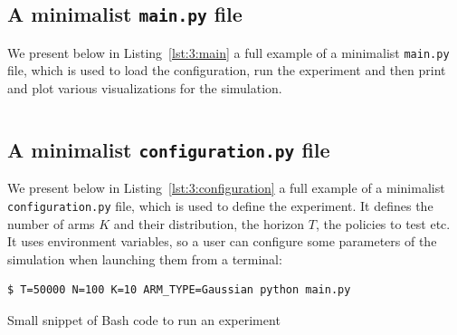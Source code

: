 {\subsection{A minimalist \texttt{main.py} file}

We present below in Listing~\ref{lst:3:main} a full example of a minimalist \texttt{main.py} file,
which is used to load the configuration, run the experiment and then print and plot various visualizations for the simulation.

\begin{small}
    \inputminted[linenos=true,numbersep=5pt,frame=lines,framesep=2mm]{python3}{2-Chapters/3-Chapter/src/example_of_main_singleplayer.py}
\end{small}


\subsection{A minimalist \texttt{configuration.py} file}

We present below in Listing~\ref{lst:3:configuration} a full example of a minimalist \texttt{configuration.py} file,
which is used to define the experiment.
It defines the number of arms $K$ and their distribution, the horizon $T$, the policies to test etc.
It uses environment variables, so a user can configure some parameters of the simulation when launching them from a terminal:


\begin{listing}[h!]
    \begin{verbatim}
$ T=50000 N=100 K=10 ARM_TYPE=Gaussian python main.py
    \end{verbatim}
    \caption{Small snippet of Bash code to run an experiment}
    \label{lst:3:howToRunExperiment2}
\end{listing}

}
